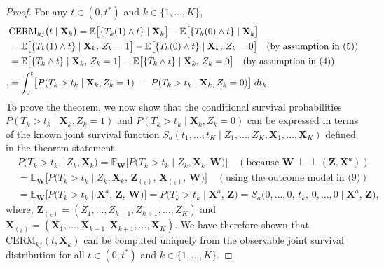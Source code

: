 \documentclass[aoas]{imsart}
\theoremstyle{plain}
\theoremstyle{definition}
\begin{document}
\begin{proof}

For any $t \in (0, t^*)$ and  $ k \in \{1,\dots,K\}$, 
\begin{align}
\nonumber &\text{CERM}_{kj}\bigl(t\mid \mathbf{X}_{k}\bigr)
= \mathbb{E}\bigl[\{T_k(1) \wedge t\}\mid \mathbf{X}_{k}\bigr]
 - \mathbb{E}\bigl[\{T_k(0) \wedge t\}\mid \mathbf{X}_{k}\bigr]\\ \nonumber 
&= \mathbb{E}\bigl[\{T_k(1) \wedge t\}\mid \mathbf{X}_{k},\,Z_{k}=1\bigr]
 - \mathbb{E}\bigl[\{T_k(0) \wedge t\}\mid \mathbf{X}_{k},\,Z_{k}=0\bigr] \quad (\text{by assumption in (5)%
 })  \\ \nonumber 
&= \mathbb{E}\bigl[\{T_k \wedge t\}\mid \mathbf{X}_{k},\,Z_{k}=1\bigr]
 - \mathbb{E}\bigl[\{T_k \wedge t\}\mid \mathbf{X}_{k},\,Z_{k}=0\bigr] \quad (\text{by assumption in (4)})\\ \nonumber.
&=\int_{0}^{t}\bigl[P(T_k>t_k\mid \mathbf X_k,Z_k=1)\;-\;P(T_k>t_k\mid \mathbf X_k,Z_k=0)\bigr]\;dt_k. 
\end{align}
    To prove the theorem, we now show that the conditional survival probabilities $P(T_k > t_k \mid \mathbf{X}_k, Z_k = 1)$ and $P(T_k > t_k \mid \mathbf{X}_k, Z_k = 0)$ can be expressed in terms of the known joint survival function $S_a(t_1, \ldots, t_K \mid Z_1, \ldots, Z_K, \mathbf{X}_1, \ldots, \mathbf{X}_K)$ defined in the theorem statement.
\begin{align*}
&P\bigl(T_k > t_k \mid Z_k, \mathbf{X}_k\bigr) = \mathbb{E}_{\mathbf{W}}\bigl[P\bigl(T_k > t_k \mid Z_k, \mathbf{X}_k, \mathbf{W}\bigr)\bigr]   \quad ( \text{because }\mathbf{W} \perp\!\!\!\perp (\mathbf{Z},\mathbf{X}^a)) \\ 
&= \mathbb{E}_{\mathbf{W}}\bigl[P\bigl(T_k > t_k \mid Z_k, \mathbf{X}_k,\,\mathbf{Z}_{(_k)},\,\mathbf{X}_{(_k)},\,\mathbf{W}\bigr)\bigr] \quad (\text{using the outcome model in (9)})\\
&= \mathbb{E}_{\mathbf{W}}\bigl[P\bigl(T_k > t_k \mid \mathbf{X}^a,\,\mathbf{Z},\,\mathbf{W}\bigr)\bigr]= P\bigl(T_k > t_k \mid \mathbf{X}^a,\,\mathbf{Z}\bigr)= 
  S_a\bigl(0,\dots,0,\,t_k,\,0,\dots,0
     \mid \mathbf{X}^a,\,\mathbf{Z}\bigr),
\end{align*}
where, $\mathbf{Z}_{(_k)}=(Z_1,\ldots,Z_{k-1},Z_{k+1},\ldots, Z_K)$ and $\mathbf{X}_{(_k)}=(\mathbf{X}_1,\ldots,\mathbf{X}_{k-1},\mathbf{X}_{k+1},\ldots, \mathbf{X}_K)$. We have therefore shown that $\text{CERM}_{kj}(t, \mathbf{X}_k)$ can be computed uniquely from the observable joint survival distribution for all $t \in (0, t^*)$ and $k \in \{1, \ldots, K\}$.
\end{proof}
\end{document}
